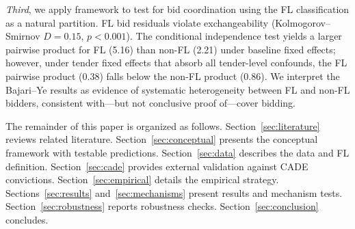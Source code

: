 \emph{Third}, we apply \cites{bajari2003deciding} framework to test %
for bid coordination using the FL classification as a natural partition.
FL bid residuals violate exchangeability (Kolmogorov--Smirnov
$D = 0.15$, $p < 0.001$). The conditional independence test yields
a larger pairwise product for FL (5.16) than non-FL (2.21) under
baseline fixed effects; however, under tender fixed effects that absorb
all tender-level confounds, the FL pairwise product (0.38) falls below
the non-FL product (0.86). We interpret the Bajari--Ye results as
evidence of systematic heterogeneity between FL and non-FL bidders,
consistent with---but not conclusive proof of---cover bidding.

The remainder of this paper is organized as follows.
Section~\ref{sec:literature} reviews related literature.
Section~\ref{sec:conceptual} presents the conceptual framework with
testable predictions. Section~\ref{sec:data} describes the data and FL
definition. Section~\ref{sec:cade} provides external validation against
CADE convictions. Section~\ref{sec:empirical} details the empirical
strategy. Sections~\ref{sec:results} and~\ref{sec:mechanisms} present
results and mechanism tests. Section~\ref{sec:robustness} reports
robustness checks. Section~\ref{sec:conclusion} concludes.
